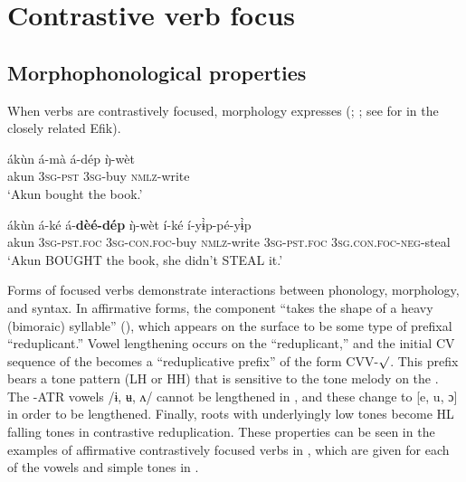 \documentclass[output=paper,
modfonts
]{langscibook}
\begin{document}
\section{Contrastive verb focus}     \label{sec:duncan:4}

\subsection{Morphophonological properties}

When verbs are contrastively focused,  morphology expresses  (\citealt[103--106]{Essien1990grammar}; \citealt{AkinlabiUrua2000,AkinlabiUrua2002}; see \citealt{Cook2002} for   in the closely related Efik).

\settowidth{}
\ea \label{ex:duncan:13}
\ea 
\gll ákùn á-mà á-dép \`{ŋ}-wèt \\
 akun 3\textsc{sg-pst} \textsc{3sg}-buy \textsc{nmlz}-write\\
\glt ‘Akun bought the book.’

\ex \label{ex:duncan:13b}
\gll ákùn á-ké á-\textbf{dèé-dép} \`{ŋ}-wèt í-ké í-y\`ɨp-pé-y\`ɨp\\
 akun 3\textsc{sg-pst.foc} \textsc{3sg-con.foc}-buy \textsc{nmlz}-write 3\textsc{sg-pst.foc} 3\textsc{sg.con.foc}-\textsc{neg}-steal\\
\glt ‘Akun BOUGHT the book, she didn’t STEAL it.’
\z
\z

 
Forms of focused verbs demonstrate interactions between phonology, morphology, and syntax. In affirmative forms, the  component “takes the shape of a heavy (bimoraic) syllable” (\citealt[156]{AkinlabiUrua2002}), which appears on the surface to be some type of prefixal “reduplicant.” Vowel lengthening occurs on the “reduplicant,” and the initial CV sequence of the   becomes a “reduplicative prefix” of the form CVV-${\surd}$. This prefix bears a tone pattern (LH or HH) that is sensitive to the tone melody on the . The -ATR vowels /ɨ, ʉ, ʌ/ cannot be lengthened in , and these change to [e, u, ɔ] in order to be lengthened. Finally,  roots with underlyingly low tones become HL falling tones in contrastive reduplication. These properties can be seen in the examples of affirmative contrastively focused verbs in , which are given for each of the vowels and simple tones in .
\end{document}
